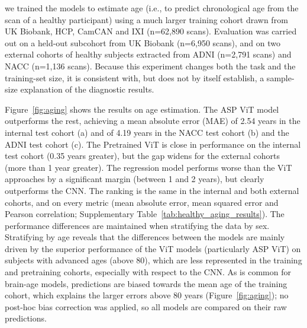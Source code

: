 \documentclass[pdflatex,sn-nature]{sn-jnl}%
\newif\ifhighlight
\newcommand{\rev}[1]{\ifhighlight{\color{blue}{}#1}\else#1\fi}%
\newcommand{\revdel}[1]{\ifhighlight{\color{red}\sout{#1}}\fi}
\theoremstyle{thmstyleone}%
\theoremstyle{thmstyletwo}%
\theoremstyle{thmstylethree}%
\begin{document}
\revdel{We conjecture that the inability of the more complex deep-learning models to outperform the simpler linear model is due to the limited training data available for each task. In order to investigate this further,} we trained the models to estimate \revdel{biological} age \rev{(i.e., to predict chronological age from the scan of a healthy participant)} using a much larger training cohort drawn from UK Biobank, HCP, CamCAN and IXI (n=62,890\rev{ scans}). Evaluation was carried out on a held-out subcohort from UK Biobank (n=6,950\rev{ scans}), and on two external cohorts of healthy subjects extracted from ADNI (n=2,791\rev{ scans}) and NACC (n=1,136\rev{ scans}). \rev{Because this experiment changes both the task and the training-set size, it is consistent with, but does not by itself establish, a sample-size explanation of the diagnostic results.}

Figure~\ref{fig:aging} shows the results on age estimation. The ASP ViT model outperforms the rest, achieving a mean absolute error (MAE) of 2.54 years in the internal test cohort (a) and of 4.19 years in the NACC test cohort (b) and the ADNI test cohort (c). The Pretrained ViT is close in performance on the internal test cohort (0.35 years greater), but the gap widens for the external cohorts (more than 1 year greater). The \revdel{logistic} regression model performs worse than the ViT approaches by a significant margin (between 1 and 2 years), but clearly outperforms the CNN. \rev{The ranking is the same in the internal and both external cohorts, and on every metric (mean absolute error, mean squared error and Pearson correlation; Supplementary Table~\ref{tab:healthy_aging_results}).} The performance differences are maintained when stratifying the data by sex. Stratifying by age reveals that the differences between the models are mainly driven by the superior performance of the ViT models (particularly ASP ViT) on subjects with advanced ages (above 80), which are less represented in the training and pretraining cohorts, especially with respect to the CNN. \rev{As is common for brain-age models, predictions are biased towards the mean age of the training cohort, which explains the larger errors above 80 years (Figure~\ref{fig:aging}); no post-hoc bias correction was applied, so all models are compared on their raw predictions.} 
\end{document}

